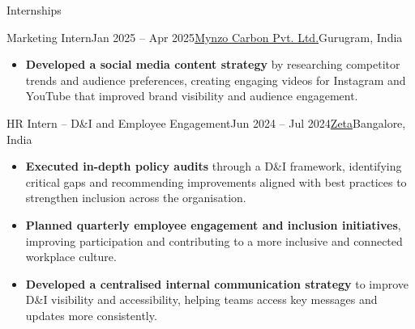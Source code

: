 \documentclass[hidelinks]{resume}
\begin{document}
\begin{rSection}{Internships}
    \begin{rSubsection}{Marketing Intern}{Jan 2025 -- Apr 2025}{\href{https://www.mynzocarbon.com/}{Mynzo Carbon Pvt. Ltd.}}{Gurugram, India}
        \begin{itemize}[leftmargin=1.2em, itemsep=0pt, parsep=0pt, topsep=0pt, partopsep=0pt]
            \item \textcolor{neutral}{\textbf{Developed a social media content strategy}} by researching competitor trends and audience preferences, creating engaging videos for Instagram and YouTube that improved brand visibility and audience engagement.
        \end{itemize}
    \end{rSubsection}

    \begin{rSubsection}{HR Intern -- D\&I and Employee Engagement}{Jun 2024 -- Jul 2024}{\href{https://www.zeta.tech/}{Zeta}}{Bangalore, India}
        \begin{itemize}[leftmargin=1.2em, itemsep=0pt, parsep=0pt, topsep=0pt, partopsep=0pt]
            \item \textcolor{neutral}{\textbf{Executed in-depth policy audits}} through a D\&I framework, identifying critical gaps and recommending improvements aligned with best practices to strengthen inclusion across the organisation.
            \item \textcolor{neutral}{\textbf{Planned quarterly employee engagement and inclusion initiatives}}, improving participation and contributing to a more inclusive and connected workplace culture.
            \item \textcolor{neutral}{\textbf{Developed a centralised internal communication strategy}} to improve D\&I visibility and accessibility, helping teams access key messages and updates more consistently.
        \end{itemize}
    \end{rSubsection}


\end{rSection}
\end{document}
